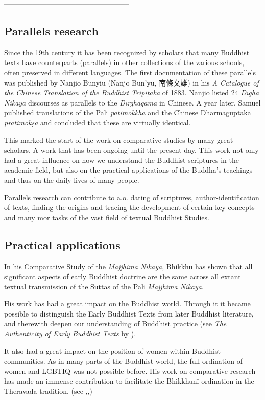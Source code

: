 -----------------------------------------------------

\subsection{Parallels research}
Since the 19th century it has been recognized by scholars that many Buddhist texts have counterparts (parallels) in other collections of the various schools, often preserved in different languages. The first documentation of these parallels was published by Nanjio Bunyiu (Nanjō Bun'yū, 南條文雄) in his {\em A Catalogue of the Chinese Translation of the Buddhist Tripiṭaka} of 1883. Nanjio listed 24 {\em Dīgha Nikāya} discourses as parallels to the {\em Dīrghāgama} in Chinese. A year later, Samuel \cite{beal} published translations of the Pāli {\em pātimokkha} and the Chinese Dharmaguptaka {\em prātimokṣa} and concluded that these are virtually identical.

This marked the start of the work on comparative studies by many great scholars. A work that has been ongoing until the present day. This work not only had a great influence on how we understand the Buddhist scriptures in the academic field, but also on the practical applications of the Buddha's teachings and thus on the daily lives of many people.

Parallels research can contribute to a.o. dating of scriptures, author-identification of texts, finding the origins and tracing the development of certain key concepts and many mor tasks of the vast field of textual Buddhist Studies.

\subsection{Practical applications}
In his Comparative Study of the {\em Majjhima Nikāya}, Bhikkhu \cite{analayo2011} has shown that all significant aspects of early Buddhist doctrine are the same across all extant textual transmission of the Suttas of the Pāli {\em Majjhima Nikāya}.

His work has had a great impact on the Buddhist world. Through it it became possible to distinguish the Early Buddhist Texts from later Buddhist literature, and therewith deepen our understanding of Buddhist practice (see {\em The Authenticity of Early Buddhist Texts} by \cite{sujatobrahmali}). 

It also had a great impact on the position of women within Buddhist communities. As in many parts of the Buddhist world, the full ordination of women and LGBTIQ was not possible before. His work on comparative research has made an immense contribution to facilitate the Bhikkhunī ordination in the Theravada tradition. (see \cite{analayo2018},\cite{analayo2018-2},\cite{analayo2013})

